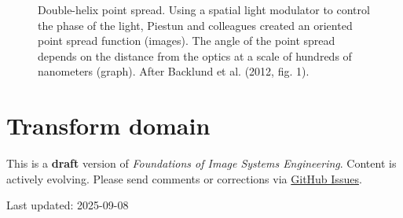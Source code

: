 \documentclass[
  letterpaper,
]{book}
\begin{document}
\begin{figure}


\caption{\label{fig-optics-double-helix}Double-helix point spread. Using
a spatial light modulator to control the phase of the light, Piestun and
colleagues created an oriented point spread function (images). The angle
of the point spread depends on the distance from the optics at a scale
of hundreds of nanometers (graph). After Backlund et al. (2012, fig.
1).}

\end{figure}%

\chapter{Transform domain}\label{sec-optics-linear-harmonics}

\begin{tcolorbox}[enhanced jigsaw, colframe=quarto-callout-warning-color-frame, titlerule=0mm, rightrule=.15mm, opacitybacktitle=0.6, colback=white, leftrule=.75mm, coltitle=black, title=\textcolor{quarto-callout-warning-color}{\faExclamationTriangle}\hspace{0.5em}{Work in Progress}, bottomrule=.15mm, colbacktitle=quarto-callout-warning-color!10!white, breakable, left=2mm, bottomtitle=1mm, toptitle=1mm, opacityback=0, arc=.35mm, toprule=.15mm]

This is a \textbf{draft} version of \emph{Foundations of Image Systems
Engineering}. Content is actively evolving. Please send comments or
corrections via \href{https://github.com/wandell/FISE-git/issues}{GitHub
Issues}.

Last updated: 2025-09-08

\end{tcolorbox}
\end{document}

